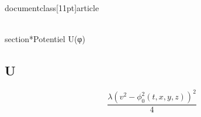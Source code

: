 \\documentclass[11pt]{article}
\begin{document}
\\section*{Potentiel U(φ)}
\subsection*{U}
\[
\frac{\lambda \left(v^{2} - \phi_{0}^{2}{\left(t,x,y,z \right)}\right)^{2}}{4}
\]
\end{document}
